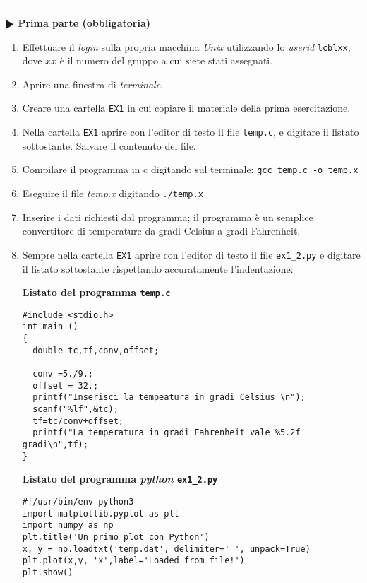 \documentclass[11pt]{article}
\begin{document}
\hrule
\vspace{2mm}
\textbf{$\RHD$ Prima parte (obbligatoria)} 
\begin{enumerate}
\item Effettuare il {\em login} sulla propria macchina {\em Unix} utilizzando lo {\em userid}  \texttt{lcblxx}, dove $xx$ \`e il numero del gruppo a cui siete stati assegnati.
\item Aprire una finestra di {\em terminale}.
\item Creare una cartella  \texttt{EX1} in cui copiare il materiale della prima esercitazione.
\item Nella cartella \texttt{EX1} aprire con l'editor di testo il file \texttt{temp.c}, e digitare il listato sottostante. Salvare il contenuto del file.
\item Compilare il programma in c digitando sul terminale:
  \texttt{gcc temp.c -o temp.x}
\item Eseguire il file {\em temp.x} digitando \texttt{./temp.x}
\item Inserire i dati richiesti dal programma; il programma \`e un semplice convertitore di temperature da gradi Celsius a gradi Fahrenheit.
\item Sempre nella cartella \texttt{EX1} aprire con l'editor di testo il file \texttt{ex1\_2.py} e digitare il listato
  sottostante rispettando accuratamente l'indentazione:
\begin{mdframed}[backgroundcolor=gray!10]
  {\bf Listato del programma \texttt{temp.c}}
  \begin{verbatim}
#include <stdio.h>
int main ()
{
  double tc,tf,conv,offset;

  conv =5./9.;
  offset = 32.;
  printf("Inserisci la tempeatura in gradi Celsius \n");
  scanf("%lf",&tc);
  tf=tc/conv+offset;
  printf("La temperatura in gradi Fahrenheit vale %5.2f gradi\n",tf);
}
\end{verbatim}
\end{mdframed}

\begin{mdframed}[backgroundcolor=gray!10]
  {\bf Listato del programma {\it python} \texttt{ex1\_2.py}}
\begin{verbatim}
#!/usr/bin/env python3
import matplotlib.pyplot as plt
import numpy as np
plt.title('Un primo plot con Python')
x, y = np.loadtxt('temp.dat', delimiter=' ', unpack=True)
plt.plot(x,y, 'x',label='Loaded from file!')
plt.show()\end{verbatim}
\end{mdframed}
\end{enumerate}
\end{document}
